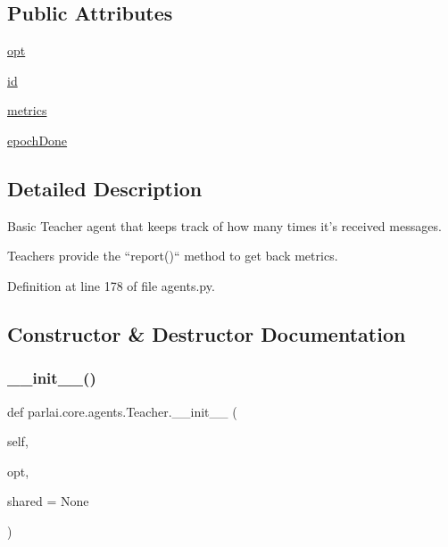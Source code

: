 \subsection*{Public Attributes}
\begin{DoxyCompactItemize}
\item 
\hyperlink{classparlai_1_1core_1_1agents_1_1Teacher_a3ce6243860ce978a897922863ed32fa4}{opt}
\item 
\hyperlink{classparlai_1_1core_1_1agents_1_1Teacher_a8385159acf54471fee8887ba2a83b53c}{id}
\item 
\hyperlink{classparlai_1_1core_1_1agents_1_1Teacher_a159705efe2a9f389d8adfdad76891f08}{metrics}
\item 
\hyperlink{classparlai_1_1core_1_1agents_1_1Teacher_a2a21915f2270b76ba0e99137d506af89}{epoch\+Done}
\end{DoxyCompactItemize}


\subsection{Detailed Description}
\begin{DoxyVerb}Basic Teacher agent that keeps track of how many times it's received messages.

Teachers provide the ``report()`` method to get back metrics.
\end{DoxyVerb}
 

Definition at line 178 of file agents.\+py.



\subsection{Constructor \& Destructor Documentation}
\mbox{\label{classparlai_1_1core_1_1agents_1_1Teacher_ab15a6b5c801681b96bcb9725df0c7c7d}} 
\subsubsection{\texorpdfstring{\+\_\+\+\_\+init\+\_\+\+\_\+()}{\_\_init\_\_()}}
{\footnotesize\ttfamily def parlai.\+core.\+agents.\+Teacher.\+\_\+\+\_\+init\+\_\+\+\_\+ (\begin{DoxyParamCaption}\item[{}]{self,  }\item[{}]{opt,  }\item[{}]{shared = {\ttfamily None} }\end{DoxyParamCaption})}



